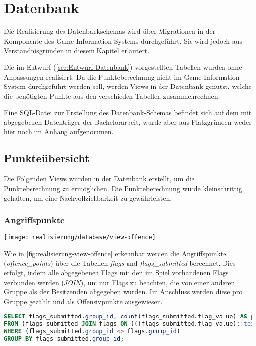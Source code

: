 \section{Datenbank}\label{sec:Realisierung-Datenbank}

Die Realisierung des Datenbankschemas wird über Migrationen in der Komponente des Game Information Systems durchgeführt. Sie wird jedoch aus Verständnisgründen in diesem Kapitel erläutert.

Die im Entwurf (\autoref{sec:Entwurf-Datenbank}) vorgestellten Tabellen wurden ohne Anpassungen realisiert. Da die Punkteberechnung nicht im Game Information System durchgeführt werden soll, werden Views in der Datenbank genutzt, welche die benötigten Punkte aus den verschieden Tabellen zusammenrechnen.

Eine SQL-Datei zur Erstellung des Datenbank-Schemas befindet sich auf dem mit abgegebenen Datenträger der Bachelorarbeit, wurde aber aus Platzgründen weder hier noch im Anhang aufgenommen.

\subsection{Punkteübersicht}
Die Folgenden Views wurden in der Datenbank erstellt, um die Punkteberechnung zu ermöglichen. Die Punkteberechnung wurde kleinschrittig gehalten, um eine Nachvollziehbarkeit zu gewährleisten.

\subsubsection{Angriffspunkte}\label{subsubsec:Angriffspunkte}
\begin{center}
	\texttt{[image: realisierung/database/view-offence]}
	\label{fig:realisierung-view-offence}
\end{center}

Wie in \autoref{fig:realisierung-view-offence} erkennbar werden die Angriffspunkte (\textit{offence\_points}) über die Tabellen \textit{flags} und \textit{flags\_submitted} berechnet. Dies erfolgt, indem alle abgegebenen Flags mit den im Spiel vorhandenen Flags verbunden werden (\textit{JOIN}), um nur Flags zu beachten, die von einer anderen Gruppe als der Besitzenden abgegeben wurden. Im Anschluss werden diese pro Gruppe gezählt und als Offensivpunkte ausgewiesen.

\begin{lstlisting}[frame=single, language=sql, caption={SQL View Angriffspunkte}, captionpos=b, label={lst:database-offence-points}]
SELECT flags_submitted.group_id, count(flags_submitted.flag_value) AS points
FROM (flags_submitted JOIN flags ON (((flags_submitted.flag_value)::text = (flags.flag_value)::text)))
WHERE (flags_submitted.group_id <> flags.group_id)
GROUP BY flags_submitted.group_id;
\end{lstlisting}

